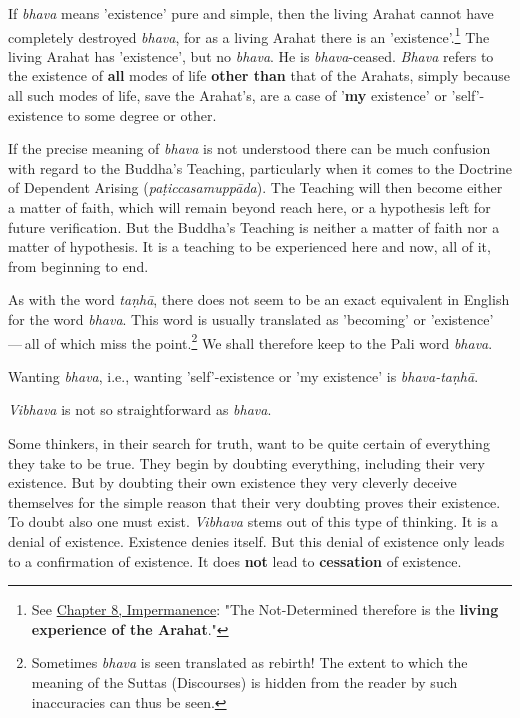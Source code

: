 If \emph{bhava} means 'existence' pure and simple, then the living Arahat
cannot have completely destroyed \emph{bhava}, for as a living Arahat there
is an 'existence'.\footnote{See \hyperlink{ch-08-impermanence#living-experience}{Chapter 8, Impermanence}: "The Not-Determined therefore is the \textbf{living experience of the Arahat}."}
The living Arahat has 'existence', but no \emph{bhava}. He is \emph{bhava}-ceased.
\emph{Bhava} refers to the existence of \textbf{all} modes of life \textbf{other than} that
of the Arahats, simply because all such modes of life, save the
Arahat’s, are a case of '\textbf{my} existence' or 'self'-existence to some
degree or other.


If the precise meaning of \emph{bhava} is not understood there can be much
confusion with regard to the Buddha’s Teaching, particularly when it
comes to the Doctrine of Dependent Arising (\emph{paṭiccasamuppāda}). The
Teaching will then become either a matter of faith, which will remain
beyond reach here, or a hypothesis left for future verification. But the
Buddha’s Teaching is neither a matter of faith nor a matter of
hypothesis. It is a teaching to be experienced here and now, all of it,
from beginning to end.


As with the word \emph{taṇhā}, there does not seem to be an exact
equivalent in English for the word \emph{bhava}. This word is usually
translated as 'becoming' or 'existence' — all of which miss the
point.\footnote{Sometimes \emph{bhava} is seen translated as rebirth! The extent to which the meaning of the Suttas (Discourses) is hidden from the reader by such inaccuracies can thus be seen.} We shall therefore
keep to the Pali word \emph{bhava}.


Wanting \emph{bhava}, i.e., wanting 'self'-existence or 'my existence' is
\emph{bhava-taṇhā}.


\emph{Vibhava} is not so straightforward as \emph{bhava}.


Some thinkers, in their search for truth, want to be quite certain of
everything they take to be true. They begin by doubting everything,
including their very existence. But by doubting their own existence they
very cleverly deceive themselves for the simple reason that their very
doubting proves their existence. To doubt also one must exist. \emph{Vibhava}
stems out of this type of thinking. It is a denial of existence.
Existence denies itself. But this denial of existence only leads to a
confirmation of existence. It does \textbf{not} lead to \textbf{cessation} of
existence.


